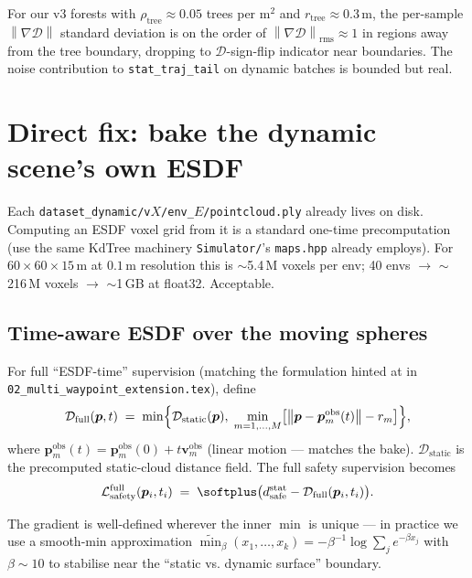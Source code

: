 \documentclass[11pt]{article}
\newcommand{\Norm}[1]{\left\lVert #1 \right\rVert}
\newcommand{\esdf}{\mathcal{D}}
\begin{document}
For our v3 forests with $\rho_{\text{tree}}\!\approx\!0.05$ trees per m$^2$
and $r_{\text{tree}}\!\approx\!0.3\,$m, the per-sample $\Norm{\nabla \esdf}$
standard deviation is on the order of $\Norm{\nabla \esdf}_{\text{rms}} \approx 1$
in regions away from the tree boundary, dropping to $\esdf$-sign-flip
indicator near boundaries. The noise contribution to
\texttt{stat\_traj\_tail} on dynamic batches is bounded but real.

\section{Direct fix: bake the dynamic scene's own ESDF}

Each \texttt{dataset\_dynamic/v$X$/env\_$E$/pointcloud.ply} already lives on
disk. Computing an ESDF voxel grid from it is a standard one-time precomputation
(use the same KdTree machinery \texttt{Simulator/}'s \texttt{maps.hpp} already
employs). For $60{\times}60{\times}15$\,m at $0.1$\,m resolution this is
$\sim$5.4\,M voxels per env; 40 envs $\to$ $\sim$216\,M voxels $\to$
$\sim$1\,GB at float32. Acceptable.

\subsection{Time-aware ESDF over the moving spheres}

For full ``ESDF-time'' supervision (matching the formulation hinted at in
\texttt{02\_multi\_waypoint\_extension.tex}), define
\begin{equation}\label{eq:esdf-time}
\esdf_{\text{full}}(\bm{p}, t)
\;=\;
\min\Bigl\{
   \esdf_{\text{static}}(\bm{p}),
   \;
   \min_{m=1,\dots,M}
   \bigl[\Norm{\bm{p} - \bm{p}_m^{\text{obs}}(t)} - r_m\bigr]
\Bigr\},
\end{equation}
where $\bm{p}_m^{\text{obs}}(t) = \bm{p}_m^{\text{obs}}(0) + t\bm{v}_m^{\text{obs}}$
(linear motion --- matches the bake). $\esdf_{\text{static}}$ is the precomputed
static-cloud distance field. The full safety supervision becomes
\begin{equation}\label{eq:safety-true}
\mathcal{L}_{\text{safety}}^{\text{full}}(\bm{p}_i, t_i)
\;=\;
\softplus\bigl(d_{\text{safe}}^{\text{stat}} - \esdf_{\text{full}}(\bm{p}_i, t_i)\bigr).
\end{equation}

The gradient is well-defined wherever the inner $\min$ is unique --- in
practice we use a smooth-min approximation
$\widetilde{\min}_\beta(x_1, \dots, x_k) = -\beta^{-1}\log\sum_j e^{-\beta x_j}$
with $\beta \sim 10$ to stabilise near the ``static vs. dynamic surface''
boundary.
\end{document}
